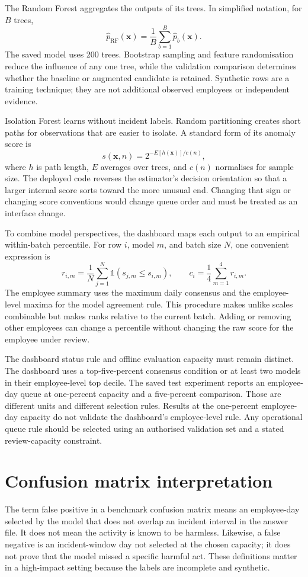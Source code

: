 The Random Forest aggregates the outputs of its trees. In simplified
notation, for \(B\) trees,
\[
 \hat p_{\mathrm{RF}}(\mathbf{x})=
 \frac{1}{B}\sum_{b=1}^{B}\hat p_b(\mathbf{x}).
\]
The saved model uses 200 trees. Bootstrap sampling and feature
randomisation reduce the influence of any one tree, while the
validation comparison determines whether the baseline or augmented
candidate is retained. Synthetic rows are a training technique; they
are not additional observed employees or independent evidence.

Isolation Forest learns without incident labels. Random partitioning
creates short paths for observations that are easier to isolate. A
standard form of its anomaly score is
\[
 s(\mathbf{x},n)=2^{-E[h(\mathbf{x})]/c(n)},
\]
where \(h\) is path length, \(E\) averages over trees, and \(c(n)\)
normalises for sample size. The deployed code reverses the estimator's
decision orientation so that a larger internal score sorts toward the
more unusual end. Changing that sign or changing score conventions
would change queue order and must be treated as an interface change.

To combine model perspectives, the dashboard maps each output to an
empirical within-batch percentile. For row \(i\), model \(m\), and
batch size \(N\), one convenient expression is
\[
 r_{i,m}=\frac{1}{N}\sum_{j=1}^{N}
    \mathbb{1}(s_{j,m}\leq s_{i,m}),
 \qquad c_i=\frac{1}{4}\sum_{m=1}^{4}r_{i,m}.
\]
The employee summary uses the maximum daily consensus and the
employee-level maxima for the model agreement rule. This procedure
makes unlike scales combinable but makes ranks relative to the current
batch. Adding or removing other employees can change a percentile
without changing the raw score for the employee under review.

The dashboard status rule and offline evaluation capacity must remain
distinct. The dashboard uses a top-five-percent consensus condition or
at least two models in their employee-level top decile. The saved test
experiment reports an employee-day queue at one-percent capacity and a
five-percent comparison. Those are different units and different
selection rules. Results at the one-percent employee-day capacity do
not validate the dashboard's employee-level rule. Any operational
queue rule should be selected using an authorised validation set and a
stated review-capacity constraint.

\section{Confusion matrix interpretation}
The term false positive in a benchmark confusion matrix means an
employee-day selected by the model that does not overlap an incident
interval in the answer file. It does not mean the activity is known to
be harmless. Likewise, a false negative is an incident-window day not
selected at the chosen capacity; it does not prove that the model
missed a specific harmful act. These definitions matter in a
high-impact setting because the labels are incomplete and synthetic.

